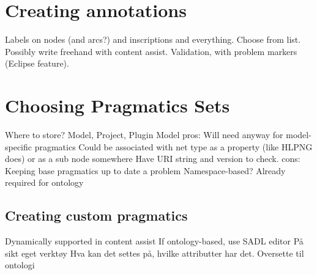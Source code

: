 \section{Creating annotations}
Labels on nodes (and arcs?) and inscriptions and everything. 
Choose from list. Possibly write freehand with content assist. Validation, with
problem markers (Eclipse feature).

\section{Choosing Pragmatics Sets}
Where to store? Model, Project, Plugin
Model pros:
	Will need anyway for model-specific pragmatics
	Could be associated with net type as a property (like HLPNG does) or as a sub
	node somewhere
	Have URI string and version to check.
cons:
	Keeping base pragmatics up to date a problem
Namespace-based? Already required for ontology


	\subsection{Creating custom pragmatics}
	Dynamically supported in content assist 
	If ontology-based, use SADL editor
	På sikt eget verktøy
		Hva kan det settes på, hvilke attributter har det.
		Oversette til ontologi

